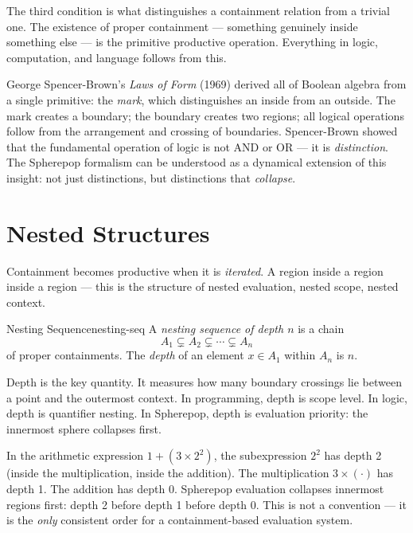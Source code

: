 The third condition is what distinguishes a containment relation from a
trivial one. The existence of proper containment — something genuinely
inside something else — is the primitive productive operation. Everything
in logic, computation, and language follows from this.

\begin{historynote}
  George Spencer-Brown's \textit{Laws of Form} (1969) derived all of Boolean
  algebra from a single primitive: the \emph{mark}, which distinguishes an
  inside from an outside. The mark creates a boundary; the boundary creates
  two regions; all logical operations follow from the arrangement and crossing
  of boundaries. Spencer-Brown showed that the fundamental operation of logic
  is not AND or OR — it is \emph{distinction}. The Spherepop formalism can be
  understood as a dynamical extension of this insight: not just distinctions,
  but distinctions that \emph{collapse}.
\end{historynote}

\section{Nested Structures}

Containment becomes productive when it is \emph{iterated}. A region inside
a region inside a region — this is the structure of nested evaluation, nested
scope, nested context.

\begin{definition}{Nesting Sequence}{nesting-seq}
  A \emph{nesting sequence of depth $n$} is a chain
  \[
    A_1 \subsetneq A_2 \subsetneq \cdots \subsetneq A_n
  \]
  of proper containments. The \emph{depth} of an element $x \in A_1$
  within $A_n$ is $n$.
\end{definition}

Depth is the key quantity. It measures how many boundary crossings lie between
a point and the outermost context. In programming, depth is scope level.
In logic, depth is quantifier nesting. In Spherepop, depth is evaluation
priority: the innermost sphere collapses first.

\begin{example}
  In the arithmetic expression $1 + (3 \times 2^2)$, the subexpression
  $2^2$ has depth 2 (inside the multiplication, inside the addition). The
  multiplication $3 \times (\cdot)$ has depth 1. The addition has depth 0.
  Spherepop evaluation collapses innermost regions first: depth 2 before
  depth 1 before depth 0. This is not a convention — it is the \emph{only}
  consistent order for a containment-based evaluation system.
\end{example}

